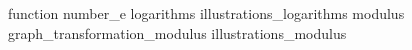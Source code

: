 {function}
\pagebreak
{number_e}
\pagebreak
{logarithms}
\pagebreak
{illustrations_logarithms}
\pagebreak
{modulus}
\pagebreak
{graph_transformation_modulus}
\pagebreak
{illustrations_modulus}




